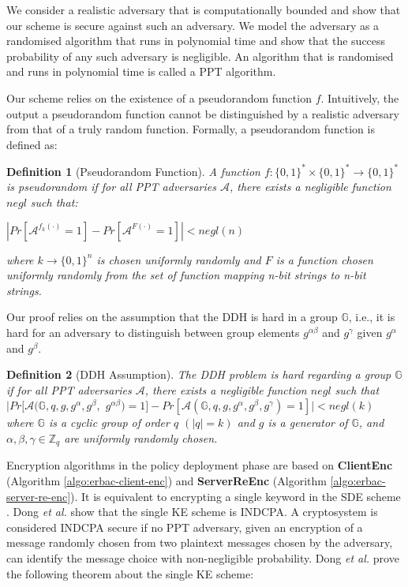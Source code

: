 \documentclass[epsfig,a4paper,11pt,titlepage]{book}
\newtheorem{definition}{Definition}
\numberwithin{algorithm}{chapter}
\begin{document}
We consider a realistic adversary that is computationally bounded and show that our scheme is secure against such an adversary. We model the adversary as a randomised algorithm that runs in polynomial time and show that the success probability of any such adversary is negligible. An algorithm that is randomised and runs in polynomial time is called a \gls{PPT} algorithm.

Our scheme relies on the existence of a pseudorandom function $f$. Intuitively, the output a pseudorandom function cannot be distinguished by a realistic adversary from that of a truly random function. Formally, a pseudorandom function is defined as:

\begin{definition}[Pseudorandom Function]
A function $f:\{0,1\}^* \times \{0,1\}^* \rightarrow \{0,1\}^*$ is pseudorandom if for all \gls{PPT} adversaries $\mathcal{A}$, there exists a negligible function $negl$ such that:
\begin{center}
$|Pr[\mathcal{A}^{f_k(\cdot)} = 1] - Pr[\mathcal{A}^{F(\cdot)} = 1]| < negl(n)$
\end{center}
where $k \rightarrow \{0,1\}^n$ is chosen uniformly randomly and $F$ is a function chosen uniformly randomly from the set of function mapping n-bit strings to n-bit strings.
\end{definition}

Our proof relies on the assumption that the \gls{DDH} is hard in a group $\mathbb{G}$, i.e., it is hard for an adversary to distinguish between group elements $g^{\alpha \beta}$ and  $g^{\gamma}$ given  $g^{\alpha}$ and  $g^{\beta}$.

\begin{definition}[\gls{DDH} Assumption]
The \gls{DDH} problem is hard regarding a group $\mathbb{G}$ if for all \gls{PPT} adversaries $\mathcal{A}$, there
exists a negligible function $negl$ such that
$|Pr[\mathcal{A}(\mathbb{G}, q, g, g^\alpha, g^\beta,$ $g^{\alpha \beta}) = 1] - Pr[\mathcal{A}(\mathbb{G}, q, g, g^\alpha, g^\beta, g^\gamma) = 1]| < negl(k)$
where $\mathbb{G}$ is a cyclic group of order $q$ $(|q| = k)$ and $g$ is a generator of $\mathbb{G}$, and $\alpha, \beta, \gamma \in \mathbb{Z}_q$ are uniformly randomly chosen.
\end{definition}

Encryption algorithms in the policy deployment phase are based on \textbf{ClientEnc} (Algorithm \ref{algo:erbac-client-enc}) and \textbf{ServerReEnc} (Algorithm \ref{algo:erbac-server-re-enc}). It is equivalent to encrypting a single keyword in the \gls{SDE} scheme \cite{Dong:2011}. Dong \emph{et al.} \cite{Dong:2011} show that the single \gls{KE} scheme is \gls{INDCPA}. A cryptosystem is considered \gls{INDCPA} secure if no \gls{PPT} adversary, given an encryption of a message randomly chosen from two plaintext messages chosen by the adversary, can identify the message choice with non-negligible probability. Dong \emph{et al.} \cite{Dong:2011} prove the following theorem about the single \gls{KE} scheme:
\end{document}
